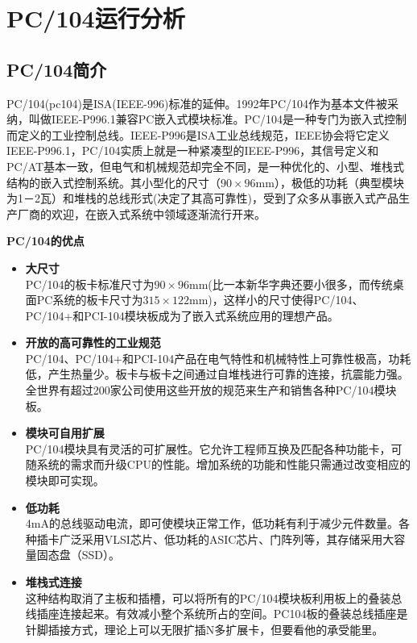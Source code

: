 %
\chapter{PC/104运行分析}
\thispagestyle{empty}
\section{PC/104简介}
PC/104(pc104)是ISA(IEEE-996)标准的延伸。1992年PC/104作为基本文件被采纳，叫做IEEE-P996.1兼容PC嵌入式模块标准。PC/104是一种专门为嵌入式控制而定义的工业控制总线。IEEE-P996是ISA工业总线规范，IEEE协会将它定义IEEE-P996.1，PC/104实质上就是一种紧凑型的IEEE-P996，其信号定义和PC/AT基本一致，但电气和机械规范却完全不同，是一种优化的、小型、堆栈式结构的嵌入式控制系统。其小型化的尺寸（$90\times 96$mm），极低的功耗（典型模块为1－2瓦）和堆栈的总线形式(决定了其高可靠性)，受到了众多从事嵌入式产品生产厂商的欢迎，在嵌入式系统中领域逐渐流行开来。

\textbf{\xiaosan PC/104的优点}
\begin{itemize}
  \item\textbf{\xiaosi 大尺寸}\\
    PC/104的板卡标准尺寸为$90\times 96$mm(比一本新华字典还要小很多，而传统桌面PC系统的板卡尺寸为$315\times 122$mm)，这样小的尺寸使得PC/104、PC/104+和PCI-104模块板成为了嵌入式系统应用的理想产品。
  \item\textbf{\xiaosi 开放的高可靠性的工业规范}\\ PC/104、PC/104+和PCI-104产品在电气特性和机械特性上可靠性极高，功耗低，产生热量少。板卡与板卡之间通过自堆栈进行可靠的连接，抗震能力强。全世界有超过200家公司使用这些开放的规范来生产和销售各种PC/104模块板。
  \item\textbf{\xiaosi 模块可自用扩展}\\ PC/104模块具有灵活的可扩展性。它允许工程师互换及匹配各种功能卡，可随系统的需求而升级CPU的性能。增加系统的功能和性能只需通过改变相应的模块即可实现。
  \item\textbf{\xiaosi 低功耗}\\ 4mA的总线驱动电流，即可使模块正常工作，低功耗有利于减少元件数量。各种插卡广泛采用VLSI芯片、低功耗的ASIC芯片、门阵列等，其存储采用大容量固态盘（SSD）。
  \item\textbf{\xiaosi 堆栈式连接}\\ 这种结构取消了主板和插槽，可以将所有的PC/104模块板利用板上的叠装总线插座连接起来。有效减小整个系统所占的空间。PC104板的叠装总线插座是针脚插接方式，理论上可以无限扩插N多扩展卡，但要看他的承受能里。
\end{itemize}
